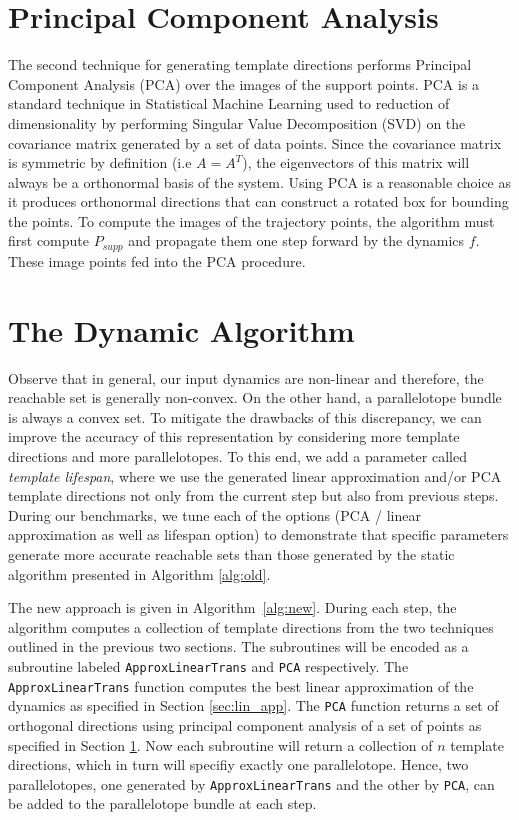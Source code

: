 \section{Principal Component Analysis}
\label{sec:pca}
The second technique for generating template directions performs Principal Component Analysis (PCA) over the images of the support points.
%
PCA is a standard technique in Statistical Machine Learning used to reduction of dimensionality by performing Singular Value Decomposition (SVD) on the covariance matrix generated by a set of data points.
%
Since the covariance matrix is symmetric by definition (i.e $A = A^T$), the eigenvectors of this matrix will always be a orthonormal basis of the system.
%
Using PCA is a reasonable choice as it produces orthonormal directions that can construct a rotated box for bounding the points.
%
To compute the images of the trajectory points, the algorithm must first compute $P_{supp}$ and propagate them one step forward by the dynamics $f$. These image points fed into the PCA procedure.

\section{The Dynamic Algorithm}
\label{sec:dyna_algo}
Observe that in general, our input dynamics are non-linear and therefore, the reachable set is generally non-convex.
%
On the other hand, a parallelotope bundle is always a convex set.
%
To mitigate the drawbacks of this discrepancy, we can improve the accuracy of this representation by considering more template directions and more parallelotopes.
%
To this end, we add a parameter called \emph{template lifespan}, where we use the generated linear approximation and/or PCA template directions not only from the current step but also from previous steps.
%
During our benchmarks, we tune each of the options (PCA / linear approximation as well as lifespan option) to demonstrate that specific parameters generate more accurate reachable sets than those generated by the static algorithm presented in Algorithm \ref{alg:old}.

The new approach is given in Algorithm~\ref{alg:new}.
%
During each step, the algorithm computes a collection of template directions from the two techniques outlined in the previous two sections. The subroutines will be encoded as a subroutine labeled \texttt{ApproxLinearTrans} and \texttt{PCA} respectively.
%
The \texttt{ApproxLinearTrans} function computes the best linear approximation of the dynamics as specified in Section \ref{sec:lin_app}.
%
The \texttt{PCA} function returns a set of orthogonal directions using principal component analysis of a set of points as specified in Section \ref{sec:pca}.
%
Now each subroutine will return a collection of $n$ template directions, which in turn will specifiy exactly one parallelotope.
%
Hence, two parallelotopes, one generated by \texttt{ApproxLinearTrans} and the other by \texttt{PCA}, can be added to the parallelotope bundle at each step.
%

